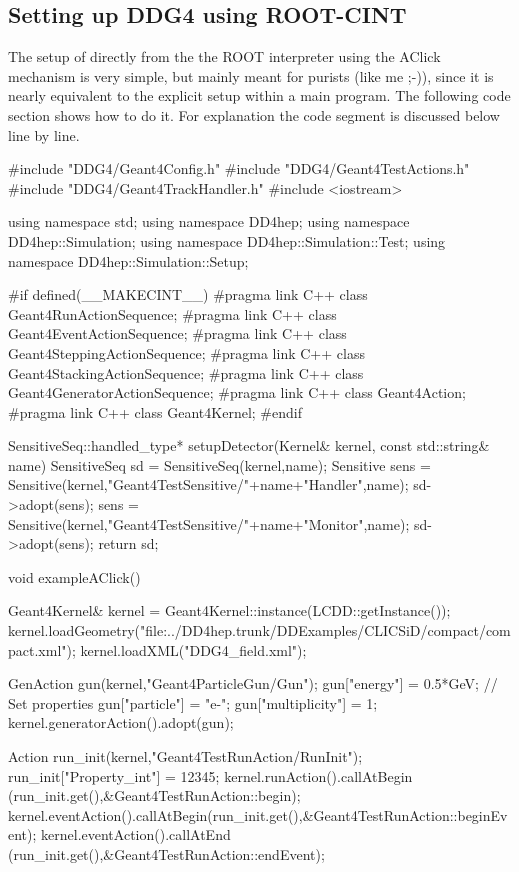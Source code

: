 \newpage
\subsection{Setting up DDG4 using ROOT-CINT}
\label{sec:ddg4-implementation-setup-root-cint}

\noindent
The setup of \DDG directly from the the ROOT interpreter using the AClick
mechanism is very simple, but mainly meant for purists (like me ;-)),
since it is nearly equivalent to the explicit setup within a  
main program.
The following code section shows how to do it. For explanation the code
segment is discussed below line by line.
\begin{code}
#include "DDG4/Geant4Config.h"
#include "DDG4/Geant4TestActions.h"
#include "DDG4/Geant4TrackHandler.h"
#include <iostream>

using namespace std;
using namespace DD4hep;
using namespace DD4hep::Simulation;
using namespace DD4hep::Simulation::Test;
using namespace DD4hep::Simulation::Setup;

#if defined(__MAKECINT__)
#pragma link C++ class Geant4RunActionSequence;
#pragma link C++ class Geant4EventActionSequence;
#pragma link C++ class Geant4SteppingActionSequence;
#pragma link C++ class Geant4StackingActionSequence;
#pragma link C++ class Geant4GeneratorActionSequence;
#pragma link C++ class Geant4Action;
#pragma link C++ class Geant4Kernel;
#endif

SensitiveSeq::handled_type* setupDetector(Kernel& kernel, const std::string& name)   {
  SensitiveSeq sd = SensitiveSeq(kernel,name);
  Sensitive  sens = Sensitive(kernel,"Geant4TestSensitive/"+name+"Handler",name);
  sd->adopt(sens);
  sens = Sensitive(kernel,"Geant4TestSensitive/"+name+"Monitor",name);
  sd->adopt(sens);
  return sd;
}

void exampleAClick()  {
  Geant4Kernel& kernel = Geant4Kernel::instance(LCDD::getInstance());
  kernel.loadGeometry("file:../DD4hep.trunk/DDExamples/CLICSiD/compact/compact.xml");
  kernel.loadXML("DDG4_field.xml");

  GenAction gun(kernel,"Geant4ParticleGun/Gun");
  gun["energy"] = 0.5*GeV;                          // Set properties
  gun["particle"] = "e-";
  gun["multiplicity"] = 1;
  kernel.generatorAction().adopt(gun);

  Action run_init(kernel,"Geant4TestRunAction/RunInit");
  run_init["Property_int"] = 12345;
  kernel.runAction().callAtBegin  (run_init.get(),&Geant4TestRunAction::begin);
  kernel.eventAction().callAtBegin(run_init.get(),&Geant4TestRunAction::beginEvent);
  kernel.eventAction().callAtEnd  (run_init.get(),&Geant4TestRunAction::endEvent);

}
\end{code}
